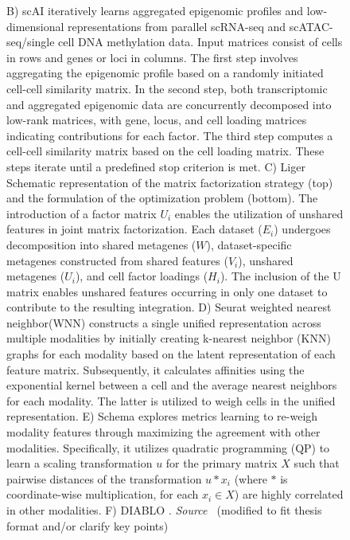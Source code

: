 \addtocounter{figure}{-1}
\begin{figure}[t!]
  \caption{
	B) scAI iteratively learns aggregated epigenomic profiles and low-dimensional representations from parallel scRNA-seq and scATAC-seq/single cell DNA methylation data. Input matrices consist of cells in rows and genes or loci in columns. The first step involves aggregating the epigenomic profile based on a randomly initiated cell-cell similarity matrix. In the second step, both transcriptomic and aggregated epigenomic data are concurrently decomposed into low-rank matrices, with gene, locus, and cell loading matrices indicating contributions for each factor. The third step computes a cell-cell similarity matrix based on the cell loading matrix. These steps iterate until a predefined stop criterion is met.
	C) Liger Schematic representation of the matrix factorization strategy (top) and the formulation of the optimization problem (bottom). The introduction of a factor matrix $U_i$ enables the utilization of unshared features in joint matrix factorization. Each dataset ($E_i$) undergoes decomposition into shared metagenes ($W$), dataset-specific metagenes constructed from shared features ($V_i$), unshared metagenes ($U_i$), and cell factor loadings ($H_i$). The inclusion of the U matrix enables unshared features occurring in only one dataset to contribute to the resulting integration.
	D) Seurat weighted nearest neighbor(WNN) constructs a single unified representation across multiple modalities by initially creating k-nearest neighbor (KNN) graphs for each modality based on the latent representation of each feature matrix. Subsequently, it calculates affinities using the exponential kernel between a cell and the average nearest neighbors for each modality. The latter is utilized to weigh cells in the unified representation.
	E) Schema explores metrics learning to re-weigh modality features through maximizing the agreement with other modalities. Specifically, it utilizes quadratic programming (QP) to learn a scaling transformation $u$ for the primary matrix $X$ such that pairwise distances of the transformation $u * x_i$ (where $*$ is coordinate-wise multiplication, for each $x_i\in X$) are highly correlated in other modalities.
	F) DIABLO . \emph{Source ~\cite{tewari2017mofa,jin2020scai,kriebel2022uinmf,hao2021seurat4,singh2021schema,singh2019diablo}}(modified to fit thesis format and/or clarify key points)
  }
\end{figure}
